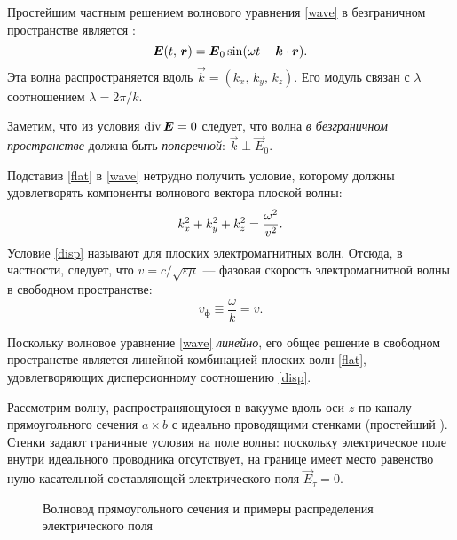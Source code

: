 Простейшим частным решением волнового уравнения \eqref{wave} в безграничном пространстве 
является :
\begin{equation} \eqmark{flat}
\vec{E}(t,\,\vec{r}) = \vec{E}_{0} \sin(\omega t - \vec{k}\cdot\vec{r}).
\end{equation}
Эта волна распространяется вдоль  $\vec{k}=(k_x,\,k_y,\,k_z)$.
Его модуль связан с  $\lambda$ соотношением $\lambda=2\pi/k$.

Заметим, что из условия $\mathop{\mathrm{div}} {\boldsymbol{E}}=0$ следует, что волна \emph{в безграничном
пространстве} должна быть \emph{поперечной}: $\vec{k} \perp \vec{E}_0$. 

Подставив \eqref{flat} в
\eqref{wave} нетрудно получить условие, которому должны удовлетворять компоненты
волнового вектора плоской волны:
\begin{equation} \eqmark{disp}
k_x^2 + k_y^2 + k_z^2 = \frac{\omega^2}{v^2}.
\end{equation}
Условие \eqref{disp} называют  для
плоских электромагнитных волн. Отсюда, в частности, следует, что
$v=c/\sqrt{\varepsilon\mu}$ --- фазовая скорость электромагнитной 
волны в свободном пространстве:
\[
v_{ф} \equiv \frac{\omega}{k} = v.
\]

Поскольку волновое уравнение \eqref{wave} \emph{линейно}, его общее решение 
в свободном пространстве является линейной комбинацией плоских
волн \eqref{flat}, удовлетворяющих дисперсионному соотношению \eqref{disp}.


Рассмотрим волну, распространяющуюся в вакууме вдоль оси $z$ по каналу 
прямоугольного сечения $a\times b$ с идеально проводящими стенками 
(простейший ).
Стенки задают граничные условия на поле волны:
поскольку электрическое поле внутри идеального проводника отсутствует,
на границе имеет место равенство нулю касательной составляющей
электрического поля $\vec{E}_{\tau} = 0$. 

\begin{figure}[h!]
    \centering
    \caption{Волновод прямоугольного сечения и примеры распределения
        \mbox{электрического} поля} 
\end{figure}


